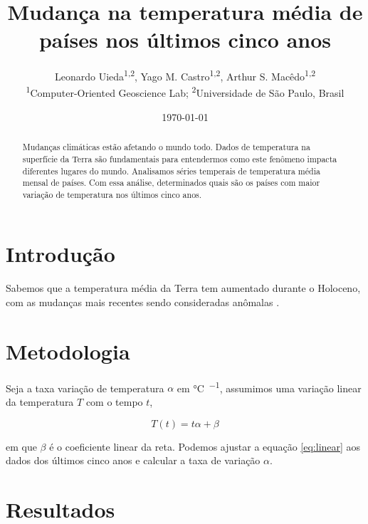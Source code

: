 \documentclass[twocolumn,A4]{article}
\begin{document}
\title{Mudança na temperatura média de países nos últimos cinco anos}
\author{
    Leonardo Uieda\textsuperscript{1,2},
    Yago M. Castro\textsuperscript{1,2},
    Arthur S. Macêdo\textsuperscript{1,2}
    \\[0.2cm]
    {\small
        \textsuperscript{1}Computer-Oriented Geoscience Lab;
        \textsuperscript{2}Universidade de São Paulo, Brasil
    }
}
\date{\today}

\maketitle

\begin{abstract}
Mudanças climáticas estão afetando o mundo todo.
Dados de temperatura na superfície da Terra são fundamentais para entendermos como este fenômeno impacta diferentes lugares do mundo.
Analisamos séries temperais de temperatura média mensal de \NPaises{} países.
Com essa análise, determinados quais são os países com maior variação de
temperatura nos últimos cinco anos.
\end{abstract}

\section{Introdução}

Sabemos que a temperatura média da Terra tem aumentado durante o Holoceno, com
as mudanças mais recentes sendo consideradas anômalas \citet{Osman2021}.

\section{Metodologia}


Seja a taxa variação de temperatura $\alpha$ em \unit{\degreeCelsius\per\ano},
assumimos uma variação linear da temperatura $T$ com o tempo $t$,

\begin{equation}
    T(t) = t \alpha + \beta
    \label{eq:linear}
\end{equation}

\noindent
em que $\beta$ é o coeficiente linear da reta.
Podemos ajustar a equação \ref{eq:linear} aos dados dos últimos cinco anos
e calcular a taxa de variação $\alpha$.

\section{Resultados}
\end{document}
